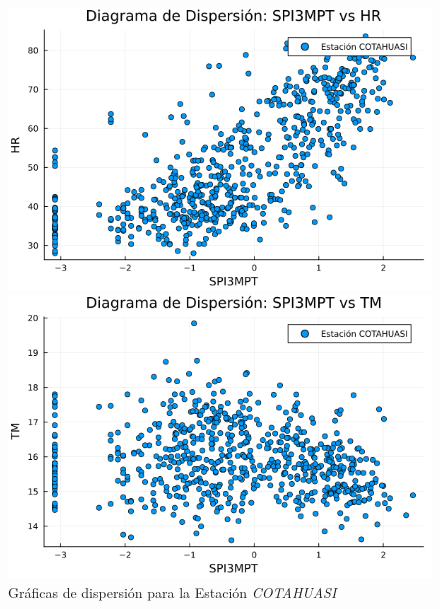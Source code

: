 \begin{figure}[htbp]
\centering
\caption{Gráficas de dispersión para la Estación \textit{COTAHUASI}}
\begin{minipage}{0.32\textwidth}
    \centering
    \includegraphics[width=\linewidth]{Capitulos/Scaterplot/COTAHUASI_SPI3MPT_vs_HR.png}
\end{minipage}\hfill
\begin{minipage}{0.32\textwidth}
    \centering
    \includegraphics[width=\linewidth]{Capitulos/Scaterplot/COTAHUASI_SPI3MPT_vs_TM.png}
\end{minipage}\hfill
\begin{minipage}{0.32\textwidth}
    \centering

\end{minipage}
\end{figure}
